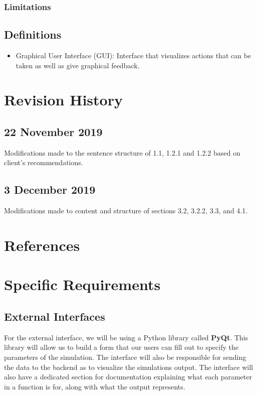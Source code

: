 \documentclass[draftclsnofoot,onecolumn,letterpaper,10pt,compsoc]{IEEEtran}
\begin{document}
\subsubsection{Limitations}
\subsection{Definitions}
\begin{itemize}
    \item Graphical User Interface (GUI): Interface that visualizes actions that can be taken as well as give graphical feedback.
\end{itemize}

\section{Revision History}
\subsection{22 November 2019}
Modifications made to the sentence structure of 1.1, 1.2.1 and 1.2.2 based on client's recommendations. 
\subsection{3 December 2019}
Modifications made to content and structure of sections 3.2, 3.2.2, 3.3, and 4.1.
\section{References}

\section{Specific Requirements}

\subsection{External Interfaces}
For the external interface, we will be using a Python library called \textbf{PyQt}. This library will allow us to build a form that our users can fill out to specify the parameters of the simulation. The interface will also be responsible for sending the data to the backend as to visualize the simulations output. The interface will also have a dedicated section for documentation explaining what each parameter in a function is for, along with what the output represents.
\end{document}
